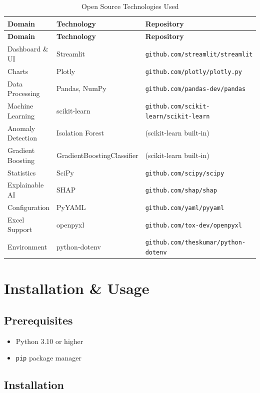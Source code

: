 \documentclass[12pt,a4paper]{article}
\begin{document}
\begin{longtable}{|p{3.5cm}|p{3.8cm}|p{5.5cm}|}
\caption{Open Source Technologies Used}
\hline
\textbf{Domain} & \textbf{Technology} & \textbf{Repository} \\
\hline
\endfirsthead
\hline
\textbf{Domain} & \textbf{Technology} & \textbf{Repository} \\
\hline
\endhead

Dashboard \& UI & Streamlit & \texttt{github.com/streamlit/streamlit} \\
Charts & Plotly & \texttt{github.com/plotly/plotly.py} \\
Data Processing & Pandas, NumPy & \texttt{github.com/pandas-dev/pandas} \\
Machine Learning & scikit-learn & \texttt{github.com/scikit-learn/scikit-learn} \\
Anomaly Detection & Isolation Forest & (scikit-learn built-in) \\
Gradient Boosting & GradientBoostingClassifier & (scikit-learn built-in) \\
Statistics & SciPy & \texttt{github.com/scipy/scipy} \\
Explainable AI & SHAP & \texttt{github.com/shap/shap} \\
Configuration & PyYAML & \texttt{github.com/yaml/pyyaml} \\
Excel Support & openpyxl & \texttt{github.com/tox-dev/openpyxl} \\
Environment & python-dotenv & \texttt{github.com/theskumar/python-dotenv} \\
\hline
\end{longtable}

\section{Installation \& Usage}

\subsection{Prerequisites}
\begin{itemize}
    \item Python 3.10 or higher
    \item \texttt{pip} package manager
\end{itemize}

\subsection{Installation}
\end{document}
